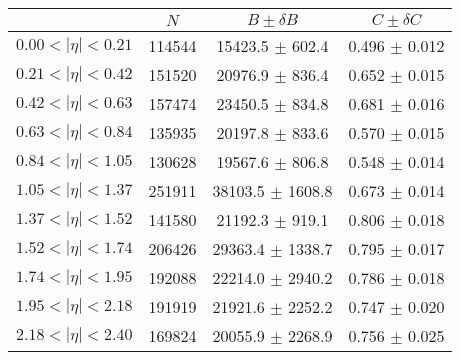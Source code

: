 \begin{tabular}{lccc}
\hline
    &   $N$   & $B \pm \delta B$  &  $C \pm \delta C$ \\
\hline
$0.00 < |\eta| <0.21$          & 114544     & 15423.5    $\pm$ 602.4 & 0.496      $\pm$ 0.012 \\
$0.21 < |\eta| <0.42$          & 151520     & 20976.9    $\pm$ 836.4 & 0.652      $\pm$ 0.015 \\
$0.42 < |\eta| <0.63$          & 157474     & 23450.5    $\pm$ 834.8 & 0.681      $\pm$ 0.016 \\
$0.63 < |\eta| <0.84$          & 135935     & 20197.8    $\pm$ 833.6 & 0.570      $\pm$ 0.015 \\
$0.84 < |\eta| <1.05$          & 130628     & 19567.6    $\pm$ 806.8 & 0.548      $\pm$ 0.014 \\
$1.05 < |\eta| <1.37$          & 251911     & 38103.5    $\pm$ 1608.8 & 0.673      $\pm$ 0.014 \\
$1.37 < |\eta| <1.52$          & 141580     & 21192.3    $\pm$ 919.1 & 0.806      $\pm$ 0.018 \\
$1.52 < |\eta| <1.74$          & 206426     & 29363.4    $\pm$ 1338.7 & 0.795      $\pm$ 0.017 \\
$1.74 < |\eta| <1.95$          & 192088     & 22214.0    $\pm$ 2940.2 & 0.786      $\pm$ 0.018 \\
$1.95 < |\eta| <2.18$          & 191919     & 21921.6    $\pm$ 2252.2 & 0.747      $\pm$ 0.020 \\
$2.18 < |\eta| <2.40$          & 169824     & 20055.9    $\pm$ 2268.9 & 0.756      $\pm$ 0.025 \\
\hline
\end{tabular}
